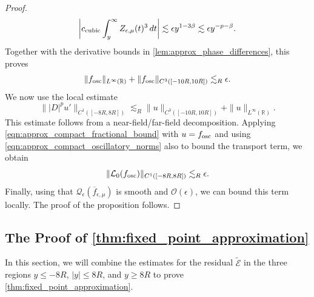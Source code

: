 \documentclass[11pt]{amsart}
\theoremstyle{definition}
\theoremstyle{remark}
\numberwithin{equation}{section}
\newcommand{\sq}[1]{\widetilde{#1}}
\newcommand{\R}{\mathbb{R}}
\newcommand{\mc}[1]{\mathcal{#1}}
\newcommand{\ov}[1]{\overline{#1}}
\begin{document}
\begin{proof}
    \[
        \left|c_{\textup{cubic}}\int_y^\infty Z_{\epsilon,\mu}(t)^3\,dt\right|
        \lesssim\epsilon y^{1-3\beta}
        \lesssim\epsilon y^{-p-\beta}.
    \]
    Together with the derivative bounds in \cref{lem:approx_phase_differences}, this proves
    \begin{equation}\label{eqn:approx_compact_oscillatory_norms}
        \|f_{\textup{osc}}\|_{L^\infty(\R)}
        +\|f_{\textup{osc}}\|_{C^3([-10R,10R])}
        \lesssim_R\epsilon.
    \end{equation}
    We now use the local estimate
    \begin{equation}\label{eqn:approx_compact_fractional_bound}
        \bigl\||D|^pu'\bigr\|_{C^1([-8R,8R])}
        \lesssim_R\|u\|_{C^3([-10R,10R])}
        +\|u\|_{L^\infty(\R)}.
    \end{equation}
    This estimate follows from a near-field/far-field decomposition. Applying \eqref{eqn:approx_compact_fractional_bound} with $u=f_{\textup{osc}}$ and using \eqref{eqn:approx_compact_oscillatory_norms} also to bound the transport term, we obtain
    \begin{equation}\label{eqn:approx_compact_oscillatory_linear}
        \|\mc{L}_0(f_{\textup{osc}})\|_{C^1([-8R,8R])}
        \lesssim_R\epsilon.
    \end{equation}
    Finally, using that $\mc{Q}_{\epsilon}(\ov{f}_{\epsilon, \mu})$ is smooth and $\mc{O}(\epsilon)$, we can bound this term locally. The proof of the proposition follows.
\end{proof}

\subsection{The Proof of \texorpdfstring{\cref{thm:fixed_point_approximation}}{}}

In this section, we will combine the estimates for the residual $\sq{\mc{E}}$ in the three regions $y \leq -8R$, $|y| \leq 8R$, and $y \geq 8R$ to prove \cref{thm:fixed_point_approximation}.
\end{document}
